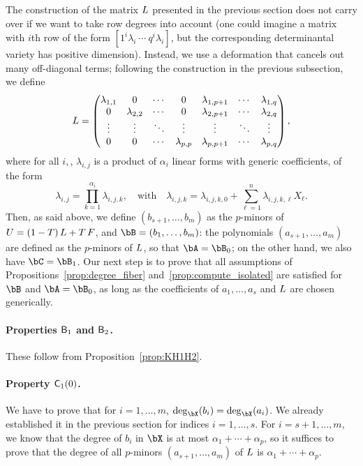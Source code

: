 \documentclass[12pt]{article}
\begin{document}
The construction of the matrix ${L}$ presented in the previous section
does not carry over if we want to take row degrees into account (one
could imagine a matrix with $i$th row of the form $[1^i
  \lambda_i~\cdots~q^i \lambda_i]$, but the corresponding determinantal
variety has positive dimension). Instead, we use a deformation that
cancels out many off-diagonal terms; following the 
construction in the previous subsection, we define
\begin{align}\label{eqdef:startrow}
{L} = \left( \begin{matrix}
\lambda_{1,1} & 0 & \cdots & 0 & \lambda_{1,p+1} & \cdots & \lambda_{1, q}\\
0 & \lambda_{2,2} & \cdots & 0 & \lambda_{2,p+1} & \cdots & \lambda_{2, q}\\
\vdots & \vdots & \ddots & \vdots & \vdots & \ddots & \vdots\\
0 & 0 & \cdots & \lambda_{p,p} & \lambda_{p,p+1} & \cdots & \lambda_{p, q}
\end{matrix} \right), 
\end{align} 
where for all $i,$, $\lambda_{i,j}$ is a product of $\alpha_i$ linear forms with generic
coefficients, of the form
$$\lambda_{i,j}= \prod_{k=1}^{\alpha_i}\lambda_{i,j,k},
\quad\text{with}\quad
\lambda_{i,j,k} =\lambda_{i,j,k,0} + \sum_{\ell=1}^n \lambda_{i,j,k,\ell}X_\ell.
$$ Then, as said above, we define $(b_{s+1},\dots,b_m)$ as the
$p$-minors of ${U}=(1-T)\,{L} + T\, {F}$, and $\bB=(b_1,\dots,b_m)$:
the polynomials $(a_{s+1},\dots,a_m)$ are defined as the $p$-minors of
${L}$, so that $\bA=\bB_0$; on the other hand, we also have
$\bC=\bB_1$.  Our next step is to prove that all assumptions of
Propositions~\ref{prop:degree_fiber} and~\ref{prop:compute_isolated}
are satisfied for $\bB$ and $\bA=\bB_0$, as long as the coefficients 
of $a_1,\dots,a_s$ and ${L}$ are chosen generically.

\paragraph{Properties $\mathsf{B}_1$ and $\mathsf{B}_2$.}
These follow from Proposition~\ref{prop:KH1H2}.

\paragraph{Property $\mathsf{C}_1(0)$.} We have to prove that for $i=1,\dots,m$,
$\deg_\bX(b_i)=\deg_\bX(a_i)$. We already established it in the
previous section for indices $i=1,\dots,s$. For $i=s+1,\dots,m$, we
know that the degree of $b_i$ in $\bX$ is at most $\alpha_1 + \cdots +
\alpha_p$, so it suffices to prove that the degree of all $p$-minors
$(a_{s+1},\dots,a_m)$ of ${L}$ is $\alpha_1 + \cdots + \alpha_p$.
\end{document}
